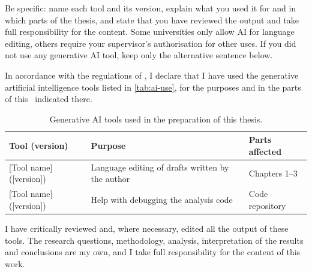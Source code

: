 
\begin{guidance}
Be specific: name each tool and its version, explain what you used it for and in which
parts of the thesis, and state that you have reviewed the output and take full
responsibility for the content. Some universities only allow AI for language editing,
others require your supervisor's authorisation for other uses. If you did not use any
generative AI tool, keep only the alternative sentence below.
\end{guidance}

In accordance with the regulations of \thesisuniversity, I declare that I have used the
generative artificial intelligence tools listed in \autoref{tab:ai-use}, for the purposes and
in the parts of this \thesistype\ indicated there.

\begin{table}[ht!]
  \centering
  \small
  \caption{Generative AI tools used in the preparation of this thesis.}
  \label{tab:ai-use}
  \begin{tabular}{@{}l p{7.2cm} l@{}}
    \toprule
    \textbf{Tool (version)} & \textbf{Purpose} & \textbf{Parts affected} \\
    \midrule
    {[Tool name]} ([version]) & Language editing of drafts written by the author & Chapters 1--3 \\
    {[Tool name]} ([version]) & Help with debugging the analysis code & Code repository \\
    \bottomrule
  \end{tabular}
\end{table}

I have critically reviewed and, where necessary, edited all the output of these tools.
The research questions, methodology, analysis, interpretation of the results and
conclusions are my own, and I take full responsibility for the content of this work.


\cleardoublepage
